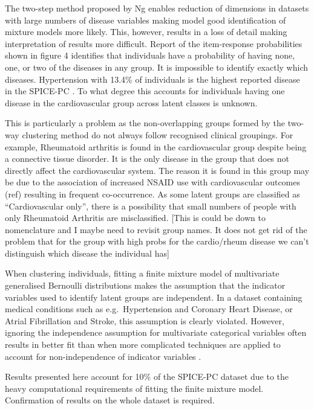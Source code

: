 \documentclass[12pt,]{report}
\begin{document}
The two-step method proposed by Ng \citeyearpar{RN72} enables reduction
of dimensions in datasets with large numbers of disease variables making
model good identification of mixture models more likely. This, however,
results in a loss of detail making interpretation of results more
difficult. Report of the item-response probabilities shown in figure 4
identifies that individuals have a probability of having none, one, or
two of the diseases in any group. It is impossible to identify exactly
which diseases. Hypertension with 13.4\% of individuals is the highest
reported disease in the SPICE-PC . To what degree this accounts for
individuals having one disease in the cardiovascular group across latent
classes is unknown.

This is particularly a problem as the non-overlapping groups formed by
the two-way clustering method do not always follow recognised clinical
groupings. For example, Rheumatoid arthritis is found in the
cardiovascular group despite being a connective tissue disorder. It is
the only disease in the group that does not directly affect the
cardiovascular system. The reason it is found in this group may be due
to the association of increased NSAID use with cardiovascular outcomes
(ref) resulting in frequent co-occurrence. As some latent groups are
classified as ``Cardiovascular only'', there is a possibility that small
numbers of people with only Rheumatoid Arthritis are misclassified.
{[}This is could be down to nomenclature and I maybe need to revisit
group names. It does not get rid of the problem that for the group with
high probs for the cardio/rheum disease we can't distinguish which
disease the individual has{]}

When clustering individuals, fitting a finite mixture model of
multivariate generalised Bernoulli distributions makes the assumption
that the indicator variables used to identify latent groups are
independent. In a dataset containing medical conditions such as
e.g.~Hypertension and Coronary Heart Disease, or Atrial Fibrillation and
Stroke, this assumption is clearly violated. However, ignoring the
independence assumption for multivariate categorical variables often
results in better fit than when more complicated techniques are applied
to account for non-independence of indicator variables
\citep{RN72, RN298, RN297}.

Results presented here account for 10\% of the SPICE-PC dataset due to
the heavy computational requirements of fitting the finite mixture
model. Confirmation of results on the whole dataset is required.
\end{document}

